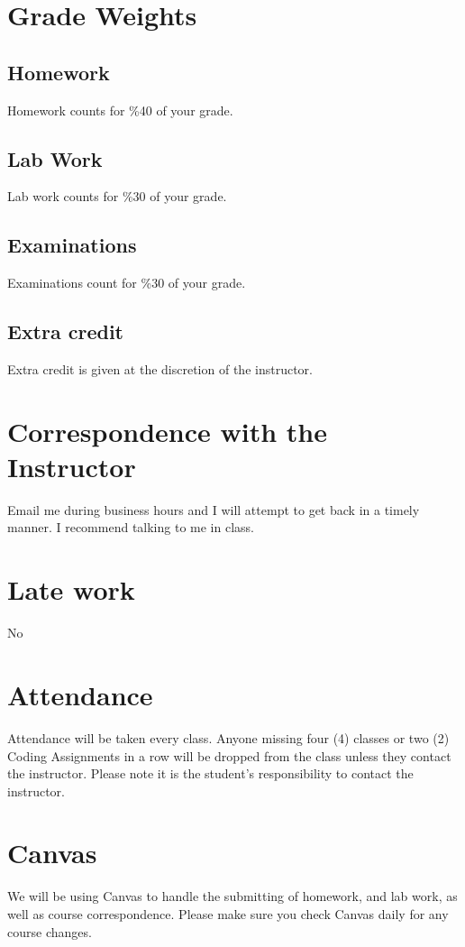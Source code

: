 \documentclass[12pt]{article}
\begin{document}
	\section*{Grade Weights}
	\subsection{Homework}
		Homework counts for \%40 of your grade.
	\subsection{Lab Work}
		Lab work counts for \%30 of your grade.
	\subsection{Examinations}
		Examinations count for \%30 of your grade.
	\subsection{Extra credit}
		Extra credit is given at the discretion of the instructor.
	
	\section*{Correspondence with the Instructor}
		Email me during business hours and I will attempt to get back in a timely manner.
		I recommend talking to me in class.
	
	\section*{Late work}
		No
	
	\section*{Attendance}
		Attendance will be taken every class. Anyone missing four (4) classes or two (2) Coding Assignments in a row will be dropped from the class unless they contact the instructor. Please note it is the student’s responsibility to contact the instructor.
	
	\section*{Canvas}
		We will be using Canvas to handle the submitting of homework, and lab work, as well as course correspondence. Please make sure you check Canvas daily for any course changes.
	
\end{document}
